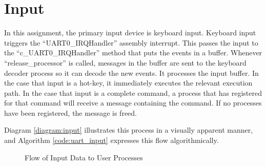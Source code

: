 \documentclass[12pt]{report}
\begin{document}
\section{Input}
\label{sec:Input}
    In this assignment, the primary input device is keyboard input.
    Keyboard input triggers the ``UART0\_IRQHandler'' assembly interrupt. This
    passes the input to the ``c\_UART0\_IRQHandler'' method that puts the events
    in a buffer. Whenever ``release\_processor'' is called, messages in the
    buffer are sent to the keyboard decoder process so it can decode the new
    events. It processes the input buffer. In the case that input is a hot-key,
    it immediately executes the relevant execution path. In the case that input
    is a complete command, a process that has registered for that command will
    receive a message containing the command. If no processes have been
    registered, the message is freed.

    Diagram \ref{diagram:input} illustrates this process in a visually
    apparent manner, and Algorithm \ref{code:uart_input} expresses this flow
    algorithmically.
    \begin{figure}
        \centering
        \caption{Flow of Input Data to User Processes}
    \end{figure}
\end{document}
